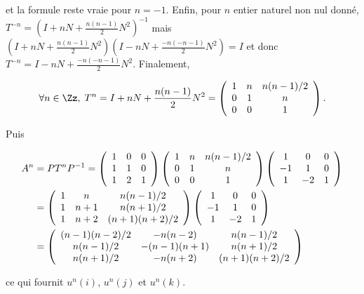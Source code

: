 {\begin{enumerate}
{et la formule reste vraie pour $n=-1$. Enfin, pour $n$ entier naturel non nul donné, $T^{-n}=(I+nN+\frac{n(n-1)}{2}N^2)^{-1}$ mais $(I+nN+\frac{n(n-1)}{2}N^2)(I-nN+\frac{-n(-n-1)}{2}N^2)=I$ et donc
$T^{-n}=I-nN+\frac{-n(-n-1)}{2}N^2$. Finalement, 

$$\forall n\in\Zz,\;T^n=I+nN+\frac{n(n-1)}{2}N^2=\left(
\begin{array}{ccc}
1&n&n(n-1)/2\\
0&1&n\\
0&0&1
\end{array}
\right).$$

Puis 

\begin{align*}\ensuremath
A^n&=PT^nP^{-1}=\left(
\begin{array}{ccc}
1&0&0\\
1&1&0\\
1&2&1
\end{array}
\right)\left(
\begin{array}{ccc}
1&n&n(n-1)/2\\
0&1&n\\
0&0&1
\end{array}
\right)\left(
\begin{array}{ccc}
1&0&0\\
-1&1&0\\
1&-2&1
\end{array}
\right)\\
 &=\left(
\begin{array}{ccc}
1&n&n(n-1)/2\\
1&n+1&n(n+1)/2\\
1&n+2&(n+1)(n+2)/2
\end{array}
\right)\left(
\begin{array}{ccc}
1&0&0\\
-1&1&0\\
1&-2&1
\end{array}
\right)
\\
 &=\left(
\begin{array}{ccc}
(n-1)(n-2)/2&-n(n-2)&n(n-1)/2\\
n(n-1)/2&-(n-1)(n+1)&n(n+1)/2\\
n(n+1)/2&-n(n+2)&(n+1)(n+2)/2
\end{array}
\right)
\end{align*}

ce qui fournit $u^n(i)$, $u^n(j)$ et $u^n(k)$.}
\end{enumerate}
}
